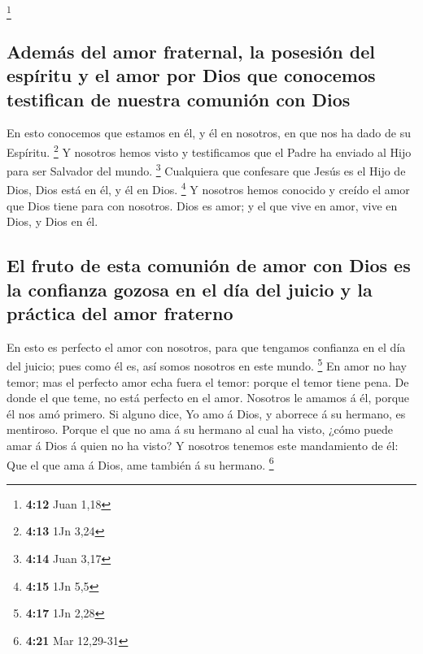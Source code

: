 \footnote{\textbf{4:12} Juan 1,18}

\hypertarget{ademuxe1s-del-amor-fraternal-la-posesiuxf3n-del-espuxedritu-y-el-amor-por-dios-que-conocemos-testifican-de-nuestra-comuniuxf3n-con-dios}{%
\subsection{Además del amor fraternal, la posesión del espíritu y el
amor por Dios que conocemos testifican de nuestra comunión con
Dios}\label{ademuxe1s-del-amor-fraternal-la-posesiuxf3n-del-espuxedritu-y-el-amor-por-dios-que-conocemos-testifican-de-nuestra-comuniuxf3n-con-dios}}

 En esto conocemos que estamos en él, y él en nosotros,
en que nos ha dado de su Espíritu. \footnote{\textbf{4:13} 1Jn 3,24}
 Y nosotros hemos visto y testificamos que el Padre ha
enviado al Hijo para ser Salvador del mundo. \footnote{\textbf{4:14}
  Juan 3,17}  Cualquiera que confesare que Jesús es el
Hijo de Dios, Dios está en él, y él en Dios. \footnote{\textbf{4:15} 1Jn
  5,5}  Y nosotros hemos conocido y creído el amor que
Dios tiene para con nosotros. Dios es amor; y el que vive en amor, vive
en Dios, y Dios en él.

\hypertarget{el-fruto-de-esta-comuniuxf3n-de-amor-con-dios-es-la-confianza-gozosa-en-el-duxeda-del-juicio-y-la-pruxe1ctica-del-amor-fraterno}{%
\subsection{El fruto de esta comunión de amor con Dios es la confianza
gozosa en el día del juicio y la práctica del amor
fraterno}\label{el-fruto-de-esta-comuniuxf3n-de-amor-con-dios-es-la-confianza-gozosa-en-el-duxeda-del-juicio-y-la-pruxe1ctica-del-amor-fraterno}}

 En esto es perfecto el amor con nosotros, para que
tengamos confianza en el día del juicio; pues como él es, así somos
nosotros en este mundo. \footnote{\textbf{4:17} 1Jn 2,28}
 En amor no hay temor; mas el perfecto amor echa fuera el
temor: porque el temor tiene pena. De donde el que teme, no está
perfecto en el amor.  Nosotros le amamos á él, porque él
nos amó primero.  Si alguno dice, Yo amo á Dios, y
aborrece á su hermano, es mentiroso. Porque el que no ama á su hermano
al cual ha visto, ¿cómo puede amar á Dios á quien no ha visto?
 Y nosotros tenemos este mandamiento de él: Que el que
ama á Dios, ame también á su hermano. \footnote{\textbf{4:21} Mar
  12,29-31}

